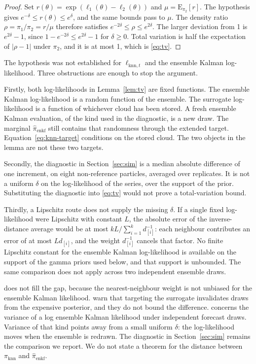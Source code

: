 \begin{proof}
Set \(r(\theta) = \exp(\ell_1(\theta) - \ell_2(\theta))\) and \(\mu = \mathrm{E}_{\pi_2}[r]\). The hypothesis gives \(e^{-\delta} \le r(\theta) \le e^{\delta}\), and the same bounds pass to \(\mu\). The density ratio \(\rho = \pi_1/\pi_2 = r/\mu\) therefore satisfies \(e^{-2\delta} \le \rho \le e^{2\delta}\). The larger deviation from 1 is \(e^{2\delta}-1\), since \(1 - e^{-2\delta} \le e^{2\delta}-1\) for \(\delta \ge 0\). Total variation is half the expectation of \(|\rho-1|\) under \(\pi_2\), and it is at most 1, which is \eqref{eq:tv}.
\end{proof}

The hypothesis was not established for \(\ell_{\mathrm{knn},t}\) and the ensemble Kalman log-likelihood. Three obstructions are enough to stop the argument.

Firstly, both log-likelihoods in Lemma~\ref{lem:tv} are fixed functions. The ensemble Kalman log-likelihood is a random function of the ensemble. The surrogate log-likelihood is a function of whichever cloud has been stored. A fresh ensemble Kalman evaluation, of the kind used in the diagnostic, is a new draw. The marginal \(\hat{\pi}_{\mathrm{enkf}}\) still contains that randomness through the extended target. Equation~\eqref{eq:knn-target} conditions on the stored cloud. The two objects in the lemma are not these two targets.

Secondly, the diagnostic in Section~\ref{sec:sim} is a median absolute difference of one increment, on eight non-reference particles, averaged over replicates. It is not a uniform \(\delta\) on the log-likelihood of the series, over the support of the prior. Substituting the diagnostic into \eqref{eq:tv} would not prove a total-variation bound.

Thirdly, a Lipschitz route does not supply the missing \(\delta\). If a single fixed log-likelihood were Lipschitz with constant \(L\), the absolute error of the inverse-distance average would be at most \(k L / \sum_{i=1}^{k} d_{[i]}^{-1}\): each neighbour contributes an error of at most \(L d_{[i]}\), and the weight \(d_{[i]}^{-1}\) cancels that factor. No finite Lipschitz constant for the ensemble Kalman log-likelihood is available on the support of the gamma priors used below, and that support is unbounded. The same comparison does not apply across two independent ensemble draws.

\citet[Proposition~1]{chopin2012} does not fill the gap, because the nearest-neighbour weight is not unbiased for the ensemble Kalman likelihood. \citet[Section~5.1]{sherlock2016} warn that targeting the surrogate invalidates draws from the expensive posterior, and they do not bound the difference. \citet[Proposition~2]{katzfuss2018} concerns the variance of a log ensemble Kalman likelihood under independent forecast draws. Variance of that kind points away from a small uniform \(\delta\): the log-likelihood moves when the ensemble is redrawn. The diagnostic in Section~\ref{sec:sim} remains the comparison we report. We do not state a theorem for the distance between \(\pi_{\mathrm{knn}}\) and \(\hat{\pi}_{\mathrm{enkf}}\).
